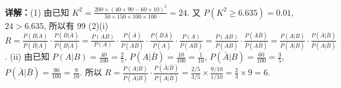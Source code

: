 \begin{question}[points=12]
\begin{solution}
\textbf{详解：}(1) 由已知 $K^2 = \frac{200 \times (40 \times 90 - 60 \times 10)^2}{50 \times 150 \times 100 \times 100} = 24$. 又 $P(K^2 \ge 6.635) = 0.01$, $24 > 6.635$, 所以有 99%
(2)(i) $R = \frac{P(B|A)}{P(\bar{B}|A)} \cdot \frac{P(\bar{B}|\bar{A})}{P(B|\bar{A})} = \frac{P(AB)}{P(A)} \cdot \frac{P(\bar{A})}{P(\bar{A}B)} \cdot \frac{P(\bar{B}\bar{A})}{P(\bar{A})} \cdot \frac{P(A)}{P(A\bar{B})} = \frac{P(AB)}{P(\bar{A}B)} \cdot \frac{P(\bar{A}\bar{B})}{P(A\bar{B})} = \frac{P(A|B)}{P(\bar{A}|B)} \cdot \frac{P(\bar{A}|\bar{B})}{P(A|\bar{B})}$.
(ii) 由已知 $P(A|B) = \frac{40}{100} = \frac{2}{5}$, $P(A|\bar{B}) = \frac{10}{100} = \frac{1}{10}$, $P(\bar{A}|B) = \frac{60}{100} = \frac{3}{5}$, $P(\bar{A}|\bar{B}) = \frac{90}{100} = \frac{9}{10}$. 所以 $R = \frac{P(A|B)}{P(\bar{A}|B)} \cdot \frac{P(\bar{A}|\bar{B})}{P(A|\bar{B})} = \frac{2/5}{3/5} \times \frac{9/10}{1/10} = \frac{2}{3} \times 9 = 6$.
\end{solution}
\end{question}

